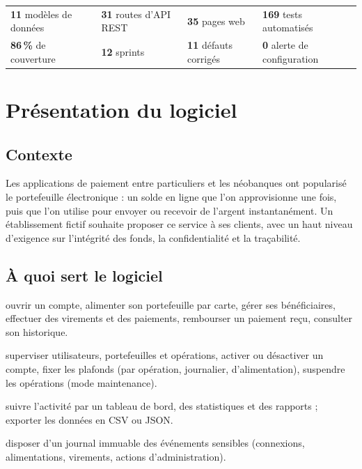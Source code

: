 \documentclass[11pt,a4paper]{report}
\begin{document}
\begin{encadre}[title=Chiffres clés]
\begin{tabularx}{\linewidth}{@{}YYYY@{}}
\textbf{\Large 11} modèles de données & \textbf{\Large 31} routes d'API REST & \textbf{\Large 35} pages web & \textbf{\Large 169} tests automatisés \\
\textbf{\Large 86\,\%} de couverture & \textbf{\Large 12} sprints & \textbf{\Large 11} défauts corrigés & \textbf{\Large 0} alerte de configuration \\
\end{tabularx}
\end{encadre}

\tableofcontents
\listoffigures
\listoftables

\cleardoublepage
{}

\chapter{Présentation du logiciel}

\section{Contexte}

Les applications de paiement entre particuliers et les néobanques ont popularisé le
portefeuille électronique : un solde en ligne que l'on approvisionne une fois, puis que
l'on utilise pour envoyer ou recevoir de l'argent instantanément. Un établissement
fictif souhaite proposer ce service à ses clients, avec un haut niveau d'exigence sur
l'intégrité des fonds, la confidentialité et la traçabilité.

\section{À quoi sert le logiciel}

\begin{description}[leftmargin=0pt, labelsep=0.6em]
  \item[Pour le client] ouvrir un compte, alimenter son portefeuille par carte, gérer
  ses bénéficiaires, effectuer des virements et des paiements, rembourser un paiement
  reçu, consulter son historique.
  \item[Pour l'établissement] superviser utilisateurs, portefeuilles et opérations,
  activer ou désactiver un compte, fixer les plafonds (par opération, journalier,
  d'alimentation), suspendre les opérations (mode maintenance).
  \item[Pour la direction] suivre l'activité par un tableau de bord, des statistiques
  et des rapports ; exporter les données en CSV ou JSON.
  \item[Pour l'audit] disposer d'un journal immuable des événements
  sensibles (connexions, alimentations, virements, actions d'administration).
\end{description}
\end{document}
